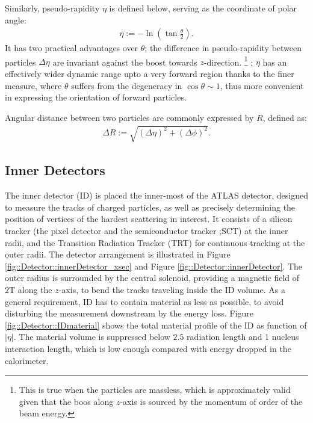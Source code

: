 Similarly, pseudo-rapidity $\eta$ is defined below, serving as the coordinate of polar angle:
\begin{align}
\eta := -\ln \left( \tan{\frac{\theta}{2}} \right).
\end{align}
It has two practical advantages over $\theta$; the difference in pseudo-rapidity between particles $\Delta\eta$ are invariant against the boost towards $z$-direction. 
\footnote{
This is true when the particles are massless, which is approximately valid given that the boos along $z$-axis is sourced by the momentum of order of the beam energy.}
; $\eta$ has an effectively wider dynamic range upto a very forward region thanks to the finer measure, where $\theta$ suffers from the degeneracy in $\cos{\theta}\sim 1$, 
thus more convenient in expressing the orientation of forward particles.

Angular distance between two particles are commonly expressed by $R$, defined as: 
\begin{align}
\Delta R := \sqrt{(\Delta\eta)^2+(\Delta\phi)^2}.
\end{align}



\subsection{Inner Detectors}
The inner detector (ID) is placed the inner-most of the ATLAS detector, designed to measure the tracks of charged particles, 
as well as precisely determining the position of vertices of the hardest scattering in interest.
It consists of a silicon tracker (the pixel detector and the semiconductor tracker ;SCT) at the inner radii,
and the Transition Radiation Tracker (TRT) for continuous tracking at the outer radii. 
The detector arrangement is illustrated in Figure \ref{fig::Detector::innerDetector_xsec} and Figure \ref{fig::Detector::innerDetector}.
The outer radius is surrounded by the central solenoid, providing a magnetic field of 2T along the $z$-axis,
to bend the tracks traveling inside the ID volume.
%
As a general requirement, ID has to contain material as less as possible, to avoid disturbing the measurement downstream by the energy loss. 
Figure \ref{fig::Detector::IDmaterial} shows the total material profile of the ID as function of $|\eta|$. 
The material volume is suppressed below $2.5$ radiation length and 1 nucleus interaction length, which is low enough compared with energy dropped in the calorimeter.


